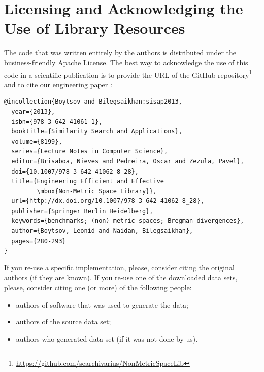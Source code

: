 \documentclass[runningheads,a4paper]{llncs}
\begin{document}
\section{Licensing and Acknowledging the Use of Library Resources}\label{SectionCredits}
The code that was written entirely by the authors is distributed 
under the business-friendly \href{http://apache.org/licenses/LICENSE-2.0}{Apache License}. 
The best way to acknowledge the use of this code 
in a scientific publication is to 
provide the URL of the GitHub repository\footnote{\url{https://github.com/searchivarius/NonMetricSpaceLib}} 
and to cite our engineering paper \cite{Boytsov_and_Bilegsaikhan:sisap2013}:

\begin{verbatim}
@incollection{Boytsov_and_Bilegsaikhan:sisap2013,
  year={2013},
  isbn={978-3-642-41061-1},
  booktitle={Similarity Search and Applications},
  volume={8199},
  series={Lecture Notes in Computer Science},
  editor={Brisaboa, Nieves and Pedreira, Oscar and Zezula, Pavel},
  doi={10.1007/978-3-642-41062-8_28},
  title={Engineering Efficient and Effective 
         \mbox{Non-Metric Space Library}},
  url={http://dx.doi.org/10.1007/978-3-642-41062-8_28},
  publisher={Springer Berlin Heidelberg},
  keywords={benchmarks; (non)-metric spaces; Bregman divergences},
  author={Boytsov, Leonid and Naidan, Bilegsaikhan},
  pages={280-293}
}
\end{verbatim}


If you re-use a specific implementation, please,
consider citing the original authors (if they are known).
If you re-use one of the downloaded data sets,
please, consider citing one (or more) of the following people:
\begin{itemize}
\item authors of software that was used to generate the data;
\item authors of the source data set;
\item authors who generated data set (if it was not done by us).
\end{itemize}
\end{document}
